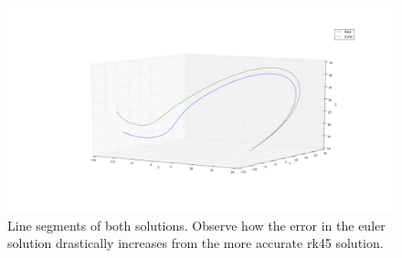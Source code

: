\documentclass[a4paper,10pt]{article}
\begin{document}
\begin{figure}
 \centering
 \includegraphics[width = \linewidth]{compare}
 \caption{Line segments of both solutions. Observe how the error in the euler solution drastically increases from the more accurate rk45 solution.}
 \label{3}
\end{figure}
\end{document}
